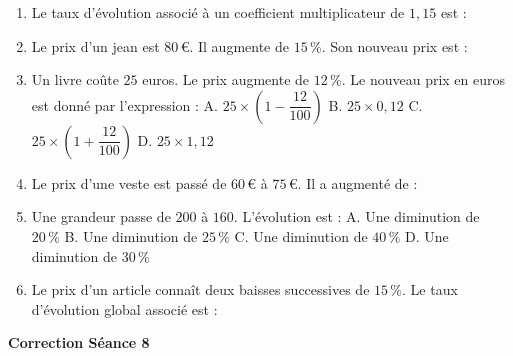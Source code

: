 \documentclass[a4paper,11pt]{article}
\begin{document}
\vspace*{2cm}
\begin{seanceD}{} %

\begin{enumerate}
\item Le taux d'évolution associé à un coefficient multiplicateur de $1{,}15$ est : \dotfill

\item Le prix d'un jean est $80$\,€. Il augmente de $15\,\%$. Son nouveau prix est : \dotfill

\item Un livre coûte $25$ euros. Le prix augmente de $12\,\%$.
Le nouveau prix en euros est donné par l'expression :
A. $25 \times (1 - \dfrac{12}{100})$ \quad B. $25 \times 0{,}12$ \quad C. $25 \times (1 + \dfrac{12}{100})$ \quad D. $25 \times 1{,}12$

\dotfill

\item Le prix d'une veste est passé de $60$\,€ à $75$\,€. Il a augmenté de : \dotfill

\item Une grandeur passe de $200$ à $160$.
L'évolution est :
A. Une diminution de $20\,\%$ \quad B. Une diminution de $25\,\%$ \quad C. Une diminution de $40\,\%$ \quad D. Une diminution de $30\,\%$

\dotfill

\item Le prix d'un article connaît deux baisses successives de $15\,\%$.
Le taux d'évolution global associé est : \dotfill

\end{enumerate}

\end{seanceD} %
\vspace{0.5cm}
\begin{center}

\textbf{\textcolor{Couleur8}{Correction Séance 8}}\\
\vspace{2mm}

\end{center}


\newpage

\end{document}
